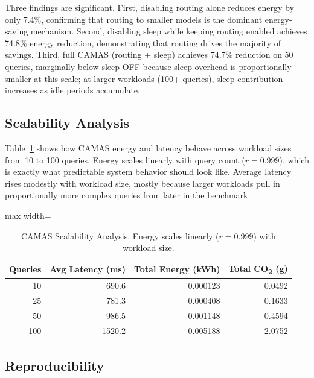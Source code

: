 \documentclass[journal]{IEEEtran}
\begin{document}
Three findings are significant. First, disabling routing alone reduces energy
by only 7.4\%, confirming that routing to smaller models is the dominant
energy-saving mechanism. Second, disabling sleep while keeping routing enabled
achieves 74.8\% energy reduction, demonstrating that routing drives the
majority of savings. Third, full CAMAS (routing + sleep) achieves 74.7\%
reduction on 50 queries, marginally below sleep-OFF because sleep overhead is
proportionally smaller at this scale; at larger workloads (100+ queries),
sleep contribution increases as idle periods accumulate.

\subsection{Scalability Analysis}

Table~\ref{tab:scalability} shows how CAMAS energy and latency behave across
workload sizes from 10 to 100 queries. Energy scales linearly with query count
($r = 0.999$), which is exactly what predictable system behavior should look
like. Average latency rises modestly with workload size, mostly because
larger workloads pull in proportionally more complex queries from later in
the benchmark.

\begin{table}[!htbp]
\renewcommand{\arraystretch}{1.3}
\centering
\caption{CAMAS Scalability Analysis. Energy scales linearly ($r = 0.999$) with
workload size.}
\label{tab:scalability}
\begin{adjustbox}{max width=\linewidth}\begin{tabular}{@{}rrrr@{}}
\toprule
\textbf{Queries} & \textbf{Avg Latency (ms)} & \textbf{Total Energy (kWh)} & \textbf{Total CO\textsubscript{2} (g)} \\
\midrule
 10  &  690.6 & 0.000123 & 0.0492 \\
 25  &  781.3 & 0.000408 & 0.1633 \\
 50  &  986.5 & 0.001148 & 0.4594 \\
100  & 1520.2 & 0.005188 & 2.0752 \\
\bottomrule
\end{tabular}\end{adjustbox}
\end{table}

\subsection{Reproducibility}
\end{document}
